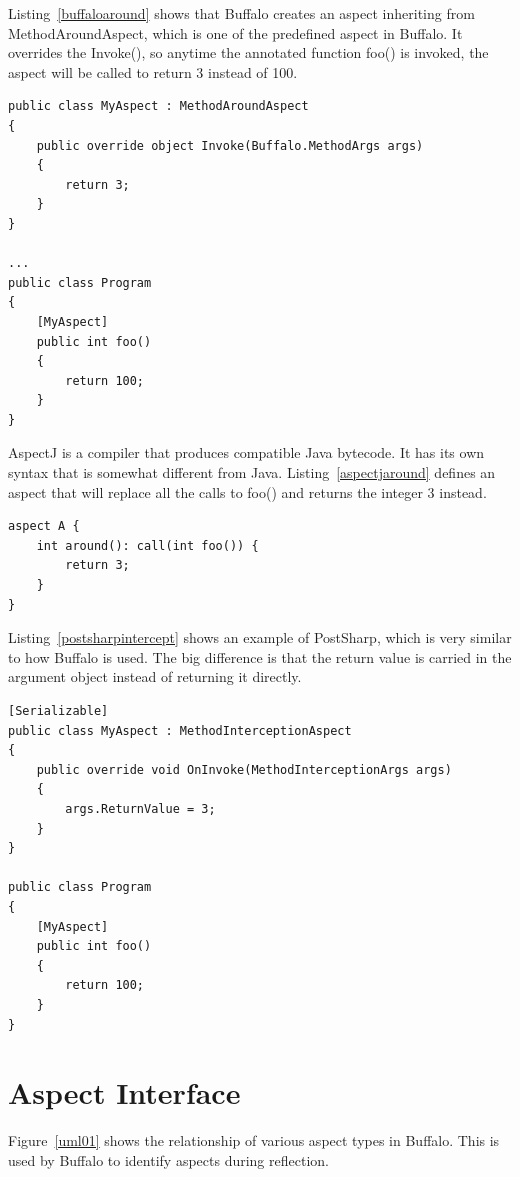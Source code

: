 Listing~\ref{buffaloaround} shows that Buffalo creates an aspect inheriting from MethodAroundAspect, which is one of the predefined aspect in Buffalo. It overrides the Invoke(), so anytime the annotated function foo() is invoked, the aspect will be called to return 3 instead of 100.

\begin{lstlisting}[caption={Buffalo MethodAroundAspect}, label=buffaloaround]
public class MyAspect : MethodAroundAspect
{
    public override object Invoke(Buffalo.MethodArgs args)
    {
        return 3;
    }
}

...
public class Program
{
    [MyAspect]
    public int foo()
    {
        return 100;
    }
}
\end{lstlisting}

AspectJ is a compiler that produces compatible Java bytecode. It has its own syntax that is somewhat different from Java. Listing~\ref{aspectjaround} defines an aspect that will replace all the calls to foo() and returns the integer 3 instead.

\begin{lstlisting}[caption={AspectJ Around}, label=aspectjaround]
aspect A {
    int around(): call(int foo()) {
        return 3;
    }
}
\end{lstlisting}


Listing~\ref{postsharpintercept} shows an example of PostSharp, which is very similar to how Buffalo is used. The big difference is that the return value is carried in the argument object instead of returning it directly.

\begin{lstlisting}[caption={PostSharp MethodInterceptionAspect}, label=postsharpintercept]
[Serializable]
public class MyAspect : MethodInterceptionAspect
{
    public override void OnInvoke(MethodInterceptionArgs args)
    {
        args.ReturnValue = 3;
    }
}

public class Program
{
    [MyAspect]
    public int foo()
    {
        return 100;
    }
}
\end{lstlisting}

\section{Aspect Interface}

Figure~\ref{uml01} shows the relationship of various aspect types in Buffalo. This is used by Buffalo to identify aspects during reflection.

